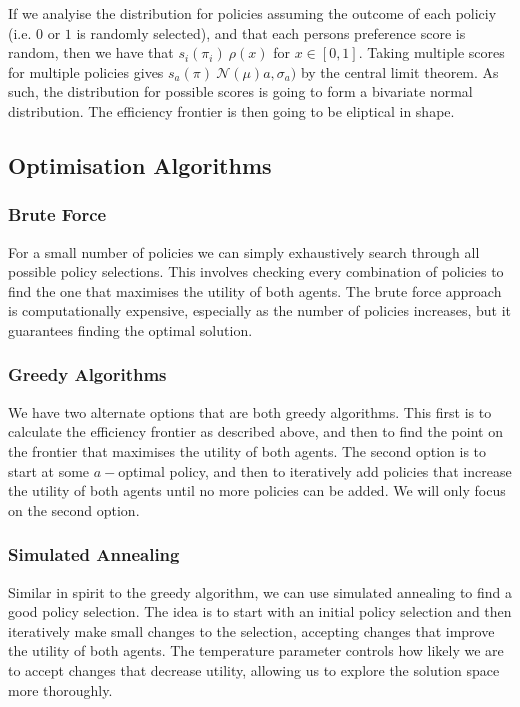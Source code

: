 \documentclass[11pt]{article}
\begin{document}
If we analyise the distribution for policies assuming the outcome of each policiy (i.e. $0$ or $1$ is randomly selected), and that each persons preference score is random, then we have that $s_i(\pi_i)~\rho(x)$ for $x\in[0, 1]$. Taking multiple scores for multiple policies gives $s_a(\pi)~\mathcal{N}(\mu)a, \sigma_a)$ by the central limit theorem. As such, the distribution for possible scores is going to form a bivariate normal distribution. The efficiency frontier is then going to be eliptical in shape. 

\subsection{Optimisation Algorithms}
\subsubsection{Brute Force}
For a small number of policies we can simply exhaustively search through all possible policy selections. This involves checking every combination of policies to find the one that maximises the utility of both agents. The brute force approach is computationally expensive, especially as the number of policies increases, but it guarantees finding the optimal solution.

\subsubsection{Greedy Algorithms}
We have two alternate options that are both greedy algorithms. This first is to calculate the efficiency frontier as described above, and then to find the point on the frontier that maximises the utility of both agents. The second option is to start at some $a-$optimal policy, and then to iteratively add policies that increase the utility of both agents until no more policies can be added. We will only focus on the second option.

\subsubsection{Simulated Annealing}
Similar in spirit to the greedy algorithm, we can use simulated annealing to find a good policy selection. The idea is to start with an initial policy selection and then iteratively make small changes to the selection, accepting changes that improve the utility of both agents. The temperature parameter controls how likely we are to accept changes that decrease utility, allowing us to explore the solution space more thoroughly.
\end{document}
